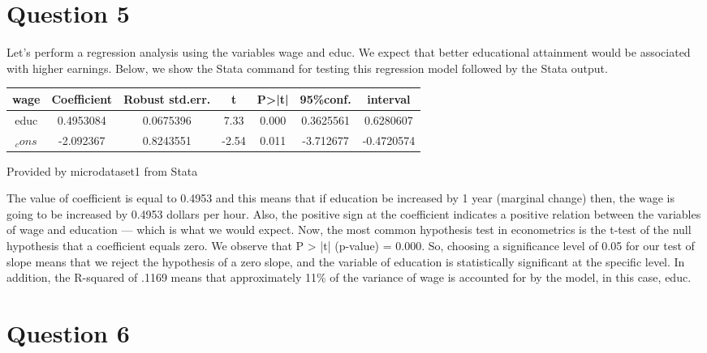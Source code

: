 \documentclass[10pt,towside,a4paper]{article}
\begin{document}
	
	\section*{Question 5}
	\vspace {0.5\baselineskip}	
	
	Let’s perform a regression analysis using the variables wage and educ. 
	We expect that better educational attainment would be associated with higher earnings. Below, we show the Stata command for testing this regression model followed by the Stata output. 
	\vspace {0.5\baselineskip}
	
\begin{table}[h]
	\begin{Center}
	 \label{tab:title} 
	\begin{tabular}{|c |c |c |c |c |c c|}
		\toprule
		wage &Coefficient & Robust std.err. & t & P>|t| & 95\%conf. & interval \\ 
		\midrule
		educ & 0.4953084 	& 0.0675396 & 7.33  & 0.000 & 0.3625561  & 0.6280607\\
		$_cons$ & -2.092367 & 0.8243551 & -2.54 & 0.011 & -3.712677  & -0.4720574\\
		
		\bottomrule
		
	\end{tabular} \par
	
	Provided by microdataset1 from Stata
	\end{Center}
	\vspace {0.5\baselineskip}
	
	The value of coefficient is equal to 0.4953 and this means that if education be increased by 1 year (marginal change) then, the wage is going to be increased by 0.4953 dollars per hour. Also, the positive sign at the coefficient indicates a positive relation between the variables of wage and education — which is what we would expect. Now, the most common hypothesis test in econometrics is the t-test of the null hypothesis that a coefficient equals zero. We observe that P  > |t| (p-value) = 0.000. So, choosing a significance level of 0.05 for our test of slope means that we reject the hypothesis of a zero slope, and the variable of education is statistically significant at the specific level. In addition, the R-squared of .1169 means that approximately 11\% of the variance of wage is accounted for by the model, in this case, educ. 
\end{table}
	\vspace {0.5\baselineskip}
	
	
	\section*{Question 6}
	\vspace {0.5\baselineskip}
	
\end{document}
